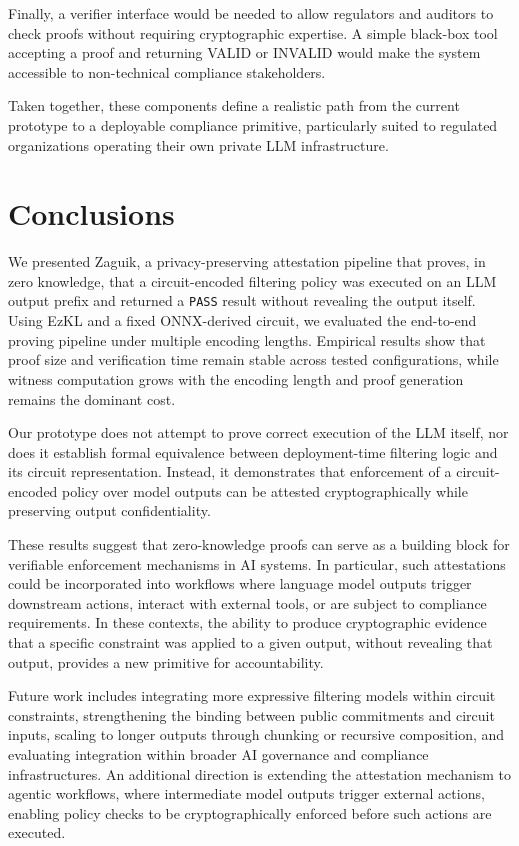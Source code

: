 \documentclass[10pt,conference,a4paper]{IEEEtran}
\begin{document}
Finally, a verifier interface would be needed to allow regulators and auditors to check proofs without requiring cryptographic expertise. A simple black-box tool accepting a proof and returning VALID or INVALID would make the system accessible to non-technical compliance stakeholders.

Taken together, these components define a realistic path from the current prototype to a deployable compliance primitive, particularly suited to regulated organizations operating their own private LLM infrastructure.

\section{Conclusions}

We presented Zaguik, a privacy-preserving attestation pipeline that proves, in zero knowledge, that a circuit-encoded filtering policy was executed on an LLM output prefix and returned a \texttt{PASS} result without revealing the output itself. Using EzKL and a fixed ONNX-derived circuit, we evaluated the end-to-end proving pipeline under multiple encoding lengths. Empirical results show that proof size and verification time remain stable across tested configurations, while witness computation grows with the encoding length and proof generation remains the dominant cost.

Our prototype does not attempt to prove correct execution of the LLM itself, nor does it establish formal equivalence between deployment-time filtering logic and its circuit representation. Instead, it demonstrates that enforcement of a circuit-encoded policy over model outputs can be attested cryptographically while preserving output confidentiality.

These results suggest that zero-knowledge proofs can serve as a building block for verifiable enforcement mechanisms in AI systems. In particular, such attestations could be incorporated into workflows where language model outputs trigger downstream actions, interact with external tools, or are subject to compliance requirements. In these contexts, the ability to produce cryptographic evidence that a specific constraint was applied to a given output, without revealing that output, provides a new primitive for accountability.

Future work includes integrating more expressive filtering models within circuit constraints, strengthening the binding between public commitments and circuit inputs, scaling to longer outputs through chunking or recursive composition, and evaluating integration within broader AI governance and compliance infrastructures. An additional direction is extending the attestation mechanism to agentic workflows, where intermediate model outputs trigger external actions, enabling policy checks to be cryptographically enforced before such actions are executed.
\end{document}
